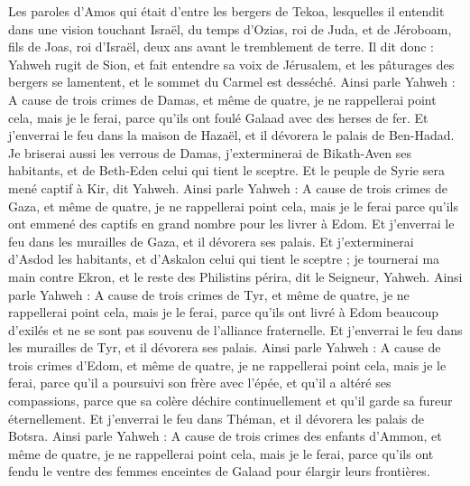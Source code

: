 \begin{multicols}{2}
\VerseOne{}Les paroles d'Amos qui était d'entre les bergers de Tekoa, lesquelles il entendit dans une vision touchant Israël, du temps d'Ozias, roi de Juda, et de Jéroboam, fils de Joas, roi d'Israël, deux ans avant le tremblement de terre.
Il dit donc : Yahweh rugit de Sion, et fait entendre sa voix de Jérusalem, et les pâturages des bergers se lamentent, et le sommet du Carmel est desséché.
Ainsi parle Yahweh : A cause de trois crimes de Damas, et même de quatre, je ne rappellerai point cela, mais je le ferai, parce qu'ils ont foulé Galaad avec des herses de fer.
Et j'enverrai le feu dans la maison de Hazaël, et il dévorera le palais de Ben-Hadad.
Je briserai aussi les verrous de Damas, j'exterminerai de Bikath-Aven ses habitants, et de Beth-Eden celui qui tient le sceptre. Et le peuple de Syrie sera mené captif à Kir, dit Yahweh.
Ainsi parle Yahweh : A cause de trois crimes de Gaza, et même de quatre, je ne rappellerai point cela, mais je le ferai parce qu'ils ont emmené des captifs en grand nombre pour les livrer à Edom.
Et j'enverrai le feu dans les murailles de Gaza, et il dévorera ses palais.
Et j'exterminerai d'Asdod les habitants, et d'Askalon celui qui tient le sceptre ; je tournerai ma main contre Ekron, et le reste des Philistins périra, dit le Seigneur, Yahweh.
Ainsi parle Yahweh : A cause de trois crimes de Tyr, et même de quatre, je ne rappellerai point cela, mais je le ferai, parce qu'ils ont livré à Edom beaucoup d'exilés et ne se sont pas souvenu de l'alliance fraternelle.
Et j'enverrai le feu dans les murailles de Tyr, et il dévorera ses palais.
Ainsi parle Yahweh : A cause de trois crimes d'Edom, et même de quatre, je ne rappellerai point cela, mais je le ferai, parce qu'il a poursuivi son frère avec l'épée, et qu'il a altéré ses compassions, parce que sa colère déchire continuellement et qu'il garde sa fureur éternellement.
Et j'enverrai le feu dans Théman, et il dévorera les palais de Botsra.
Ainsi parle Yahweh : A cause de trois crimes des enfants d'Ammon, et même de quatre, je ne rappellerai point cela, mais je le ferai, parce qu'ils ont fendu le ventre des femmes enceintes de Galaad pour élargir leurs frontières.

\end{multicols}
